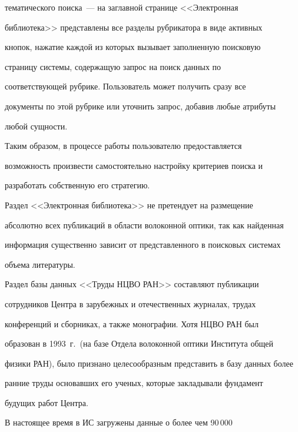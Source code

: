 тематического поиска~--- на заглавной странице <<Электронная 


библиотека>> представлены все разделы рубрикатора в виде активных 


кнопок, нажатие каждой из которых вызывает заполненную поисковую 


страницу системы, содержащую запрос на поиск данных по 


соответствующей рубрике. Пользователь может получить сразу все 


документы по этой рубрике или уточнить запрос, добавив любые атрибуты 


любой сущности. 


      


      Таким образом, в процессе работы пользователю предоставляется 


возможность произвести самостоятельно настройку критериев поиска и 


разработать собственную его стратегию. 


      


      Раздел <<Электронная библиотека>> не претендует на размещение 


абсолютно всех публикаций в области волоконной оптики, так как найденная 


информация существенно зависит от представленного в поисковых системах 


объема ли\-те\-ра\-туры.


      


      Раздел базы данных <<Труды НЦВО РАН>> составляют публикации 


сотрудников Центра в зарубежных и отечественных журналах, трудах 


конференций и сборниках, а также монографии. Хотя НЦВО РАН был 


образован в 1993~г.\ (на базе Отдела волоконной оптики Института общей 


физики РАН), было признано целесообразным представить в базу данных более 


ранние труды основавших его ученых, которые закладывали фундамент 


будущих работ Центра.


      


      В настоящее время в ИС загружены данные о более чем 90\,000 


